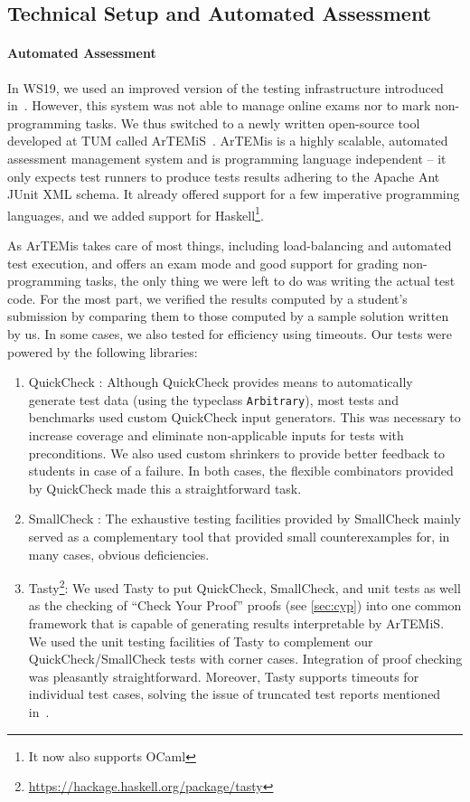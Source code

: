 \subsection{Technical Setup and Automated Assessment}\label{sec:tech_setup_test}

\paragraph{Automated Assessment}
In WS19, we used an improved version of
the testing infrastructure introduced in~\cite{next_1100}.
However, this system was not able to manage online exams nor to mark non-programming tasks.
We thus switched to a newly written open-source
tool developed at TUM called ArTEMiS~\cite{artemis}.
ArTEMis is a highly scalable, automated assessment management system and is programming language independent --
it only expects test runners to produce tests results
adhering to the Apache Ant JUnit XML schema.
It already offered support for a few imperative programming languages,
and we added support for Haskell\footnote{It now also supports OCaml}.

As ArTEMis takes care of most things,
including load-balancing and automated test execution,
and offers an exam mode and good support for grading non-programming tasks,
the only thing we were left to do was writing the actual test code.
For the most part, we verified the results computed
by a student's submission by comparing them to those
computed by a sample solution written by us.
In some cases, we also tested for efficiency using timeouts.
Our tests were powered by the following libraries:
\begin{enumerate}
  \item QuickCheck \cite{quickcheck}:
  Although QuickCheck provides means to automatically generate test data (using the typeclass \lstinline!Arbitrary!),
  most tests and benchmarks used custom QuickCheck input generators.
  This was necessary to increase coverage and eliminate non-applicable inputs for tests with preconditions.
  We also used custom shrinkers to provide better feedback to students in case of a failure.
  In both cases, the flexible combinators provided by QuickCheck made this a straightforward task.
  \item SmallCheck \cite{smallcheck}: The exhaustive testing facilities provided by SmallCheck mainly served
    as a complementary tool that provided small counterexamples for, in many cases, obvious deficiencies.
  \item Tasty\footnote{\url{https://hackage.haskell.org/package/tasty}}: We used Tasty to put QuickCheck, SmallCheck, and unit tests as well as the checking of ``Check Your Proof'' proofs (see \cref{sec:cyp}) into one common framework that is capable of generating results interpretable by ArTEMiS.
  We used the unit testing facilities of Tasty to complement our QuickCheck/SmallCheck tests with corner cases.
  Integration of proof checking was pleasantly straightforward.
  Moreover, Tasty supports timeouts for individual test cases,
  solving the issue of truncated test reports mentioned in~\cite{next_1100}.
\end{enumerate}

